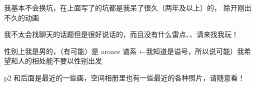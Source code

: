%

\begin{kuolieitems}
  \item 我基本不会换坑，在上面写了的坑都是我呆了很久（两年及以上）的，
        除开刚出不久的动画
  \item 我不太会找聊天的话题但是很好说话的，而且没有什么雷点、、请来找我玩！
  \item 性别上我是男的，（有可能）是 aroace 谱系
        ←我知道是谥号，所以说可能）我希望和人的相处能不要以性别出发
  \item p2 和后面是最近的一些画，空间相册里也有一些最近的各种照片，请随意看！
\end{kuolieitems}

